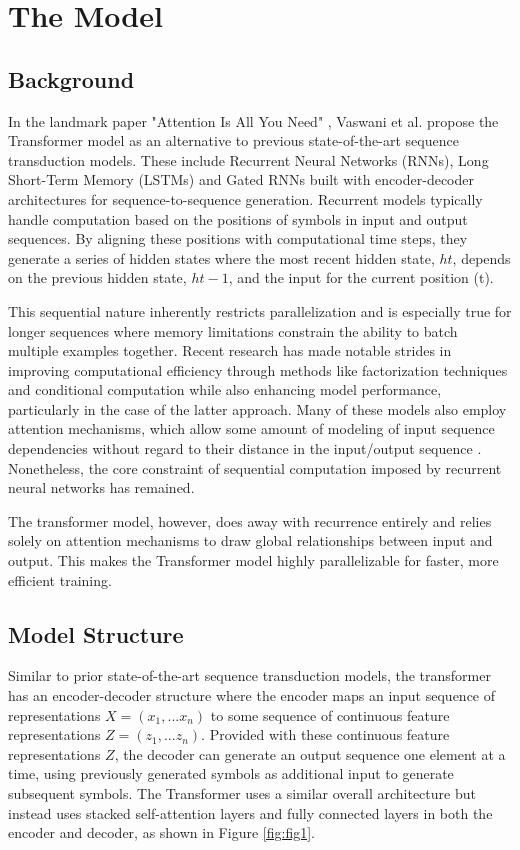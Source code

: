 \documentclass[../main.tex]{subfiles}
\begin{document}
\thispagestyle{plain}
\newpage

\section{The Model}

\subsection{Background}

In the landmark paper "Attention Is All You Need" \cite{Vaswani:1}, Vaswani et al. propose the Transformer model as an alternative to previous state-of-the-art sequence transduction models. These include Recurrent Neural Networks (RNNs), Long Short-Term Memory (LSTMs) \cite{Hochreiter:1} and Gated RNNs \cite{Chung:1} built with encoder-decoder architectures for sequence-to-sequence generation. Recurrent models typically handle computation based on the positions of symbols in input and output sequences. By aligning these positions with computational time steps, they generate a series of hidden states where the most recent hidden state, $ht$, depends on the previous hidden state, $ht-1$, and the input for the current position (t).

This sequential nature inherently restricts parallelization and is especially true for longer sequences where memory limitations constrain the ability to batch multiple examples together. Recent research has made notable strides in improving computational efficiency through methods like factorization techniques \cite{Kuchaiev:1} and conditional computation \cite{Shazeer:1} while also enhancing model performance, particularly in the case of the latter approach. Many of these models also employ attention mechanisms, which allow some amount of modeling of input sequence dependencies without regard to their distance in the input/output sequence \cite{Kim:1}. Nonetheless, the core constraint of sequential computation imposed by recurrent neural networks has remained.  

The transformer model, however, does away with recurrence entirely and relies solely on attention mechanisms to draw global relationships between input and output. This makes the Transformer model highly parallelizable for faster, more efficient training.

\subsection{Model Structure}
Similar to prior state-of-the-art sequence transduction models, the transformer has an encoder-decoder structure where the encoder maps an input sequence of representations $X = (x_1, ... x_n)$ to some sequence of continuous feature representations $Z = (z_1, ... z_n)$. Provided with these continuous feature representations $Z$, the decoder can generate an output sequence one element at a time, using previously generated symbols as additional input to generate subsequent symbols. The Transformer uses a similar overall architecture but instead uses stacked self-attention layers and fully connected layers in both the encoder and decoder, as shown in Figure \ref{fig:fig1}.
\end{document}
